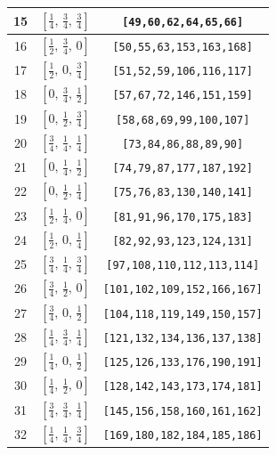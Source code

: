 \documentclass[fleqn,8pt]{jsarticle}
\begin{document}
\begin{longtable}{ccc}
15 & $\left[ \frac{1}{4},\, \frac{3}{4},\, \frac{3}{4} \right]$ & {\tt [49,60,62,64,65,66]} \\ \hline
16 & $\left[ \frac{1}{2},\, \frac{3}{4},\, 0 \right]$ & {\tt [50,55,63,153,163,168]} \\ \hline
17 & $\left[ \frac{1}{2},\, 0,\, \frac{3}{4} \right]$ & {\tt [51,52,59,106,116,117]} \\ \hline
18 & $\left[ 0,\, \frac{3}{4},\, \frac{1}{2} \right]$ & {\tt [57,67,72,146,151,159]} \\ \hline
19 & $\left[ 0,\, \frac{1}{2},\, \frac{3}{4} \right]$ & {\tt [58,68,69,99,100,107]} \\ \hline
20 & $\left[ \frac{3}{4},\, \frac{1}{4},\, \frac{1}{4} \right]$ & {\tt [73,84,86,88,89,90]} \\ \hline
21 & $\left[ 0,\, \frac{1}{4},\, \frac{1}{2} \right]$ & {\tt [74,79,87,177,187,192]} \\ \hline
22 & $\left[ 0,\, \frac{1}{2},\, \frac{1}{4} \right]$ & {\tt [75,76,83,130,140,141]} \\ \hline
23 & $\left[ \frac{1}{2},\, \frac{1}{4},\, 0 \right]$ & {\tt [81,91,96,170,175,183]} \\ \hline
24 & $\left[ \frac{1}{2},\, 0,\, \frac{1}{4} \right]$ & {\tt [82,92,93,123,124,131]} \\ \hline
25 & $\left[ \frac{3}{4},\, \frac{1}{4},\, \frac{3}{4} \right]$ & {\tt [97,108,110,112,113,114]} \\ \hline
26 & $\left[ \frac{3}{4},\, \frac{1}{2},\, 0 \right]$ & {\tt [101,102,109,152,166,167]} \\ \hline
27 & $\left[ \frac{3}{4},\, 0,\, \frac{1}{2} \right]$ & {\tt [104,118,119,149,150,157]} \\ \hline
28 & $\left[ \frac{1}{4},\, \frac{3}{4},\, \frac{1}{4} \right]$ & {\tt [121,132,134,136,137,138]} \\ \hline
29 & $\left[ \frac{1}{4},\, 0,\, \frac{1}{2} \right]$ & {\tt [125,126,133,176,190,191]} \\ \hline
30 & $\left[ \frac{1}{4},\, \frac{1}{2},\, 0 \right]$ & {\tt [128,142,143,173,174,181]} \\ \hline
31 & $\left[ \frac{3}{4},\, \frac{3}{4},\, \frac{1}{4} \right]$ & {\tt [145,156,158,160,161,162]} \\ \hline
32 & $\left[ \frac{1}{4},\, \frac{1}{4},\, \frac{3}{4} \right]$ & {\tt [169,180,182,184,185,186]} \\
\end{longtable}
\renewcommand{\arraystretch}{1.2}
\end{document}
